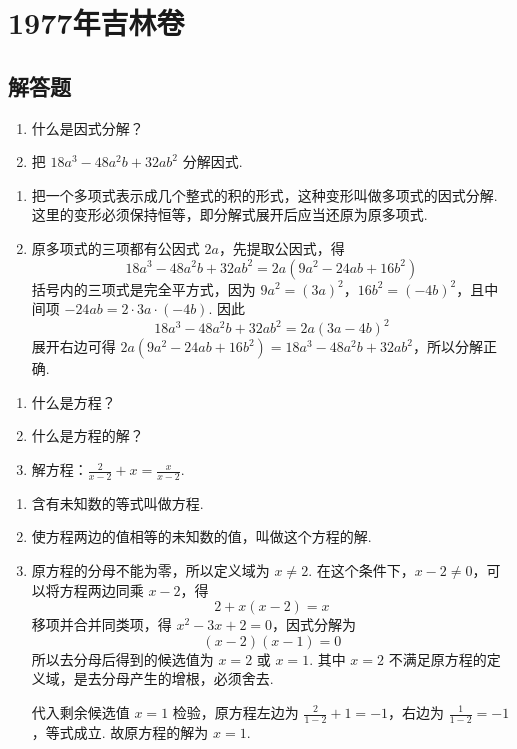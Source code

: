 \chapter{1977年吉林卷}

\section{解答题}

\begin{problem}
\begin{enumerate}
\item 什么是因式分解？
\item 把 \(18a^3-48a^2b+32ab^2\) 分解因式.
\end{enumerate}
\end{problem}

\begin{solution}
\begin{enumerate}
\item 把一个多项式表示成几个整式的积的形式，这种变形叫做多项式的因式分解. 这里的变形必须保持恒等，即分解式展开后应当还原为原多项式.

\item 原多项式的三项都有公因式 \(2a\)，先提取公因式，得
\[
18a^3-48a^2b+32ab^2=2a\left(9a^2-24ab+16b^2\right)
\]
括号内的三项式是完全平方式，因为 \(9a^2=(3a)^2\)，\(16b^2=(-4b)^2\)，且中间项
\(-24ab=2\cdot3a\cdot(-4b)\). 因此
\[
18a^3-48a^2b+32ab^2=2a\left(3a-4b\right)^2
\]
展开右边可得 \(2a(9a^2-24ab+16b^2)=18a^3-48a^2b+32ab^2\)，所以分解正确.
\end{enumerate}
\end{solution}

\begin{problem}
\begin{enumerate}
\item 什么是方程？
\item 什么是方程的解？
\item 解方程：\(\frac{2}{x-2}+x=\frac{x}{x-2}\).
\end{enumerate}
\end{problem}

\begin{solution}
\begin{enumerate}
\item 含有未知数的等式叫做方程.

\item 使方程两边的值相等的未知数的值，叫做这个方程的解.

\item 原方程的分母不能为零，所以定义域为 \(x\ne2\). 在这个条件下，\(x-2\ne0\)，可以将方程两边同乘 \(x-2\)，得
\[
2+x\left(x-2\right)=x
\]
移项并合并同类项，得 \(x^2-3x+2=0\)，因式分解为
\[
\left(x-2\right)\left(x-1\right)=0
\]
所以去分母后得到的候选值为 \(x=2\) 或 \(x=1\). 其中 \(x=2\) 不满足原方程的定义域，是去分母产生的增根，必须舍去.

代入剩余候选值 \(x=1\) 检验，原方程左边为 \(\frac{2}{1-2}+1=-1\)，右边为 \(\frac{1}{1-2}=-1\)，等式成立. 故原方程的解为 \(x=1\).
\end{enumerate}
\end{solution}


